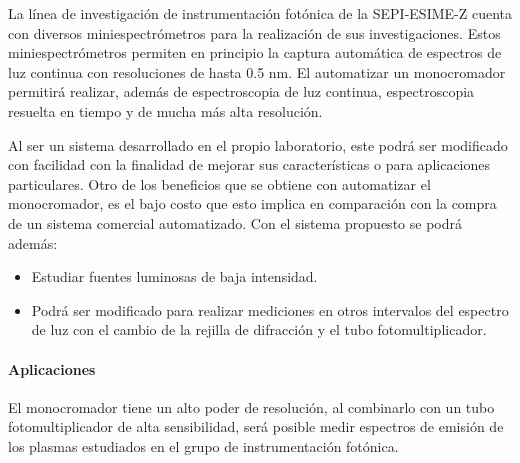 La línea de investigación de instrumentación fotónica de la SEPI-ESIME-Z cuenta con diversos miniespectrómetros para la realización de sus investigaciones. Estos miniespectrómetros permiten en principio la captura automática de espectros de luz continua  con resoluciones de hasta 0.5 nm. El automatizar un monocromador permitirá realizar, además de espectroscopia de luz continua, espectroscopia resuelta en tiempo y de mucha más alta resolución.


Al ser un sistema desarrollado en el propio laboratorio, este podrá ser modificado con facilidad con la finalidad de mejorar sus características o para aplicaciones particulares. Otro de los beneficios que se obtiene con automatizar el monocromador, es el bajo costo que esto implica en comparación con la compra de un sistema comercial automatizado. Con el sistema propuesto se podrá además:
\begin{itemize}
\item Estudiar fuentes luminosas de baja intensidad.
\item Podrá ser modificado para realizar mediciones en otros intervalos del espectro de luz con el cambio de la rejilla de difracción y el tubo fotomultiplicador.
\end{itemize}

\paragraph{Aplicaciones} 
El monocromador tiene un alto poder de resolución, al combinarlo con un tubo fotomultiplicador de alta sensibilidad, será posible medir espectros de emisión de los plasmas estudiados en el grupo de instrumentación fotónica.

